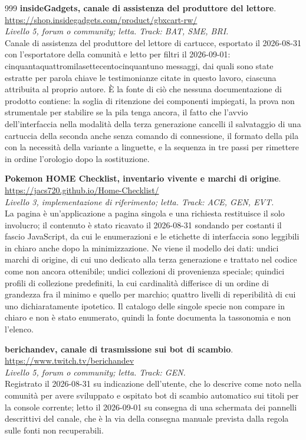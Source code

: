 \begin{thebibliography}{999}
  \textbf{insideGadgets, canale di assistenza del produttore del lettore}.
  \\ \url{https://shop.insidegadgets.com/product/gbxcart-rw/}
  \\ \emph{Livello 5, forum o community; letta. Track: BAT, SME, BRI.}
  \\ Canale di assistenza del produttore del lettore di cartucce, esportato il 2026-08-31 con l'esportatore della comunità e letto per filtri il 2026-09-01: cinquantaquattromilasettecentocinquantuno messaggi, dai quali sono state estratte per parola chiave le testimonianze citate in questo lavoro, ciascuna attribuita al proprio autore. È la fonte di ciò che nessuna documentazione di prodotto contiene: la soglia di ritenzione dei componenti impiegati, la prova non strumentale per stabilire se la pila tenga ancora, il fatto che l'avvio dell'interfaccia nella modalità della terza generazione cancelli il salvataggio di una cartuccia della seconda anche senza comando di connessione, il formato della pila con la necessità della variante a linguette, e la sequenza in tre passi per rimettere in ordine l'orologio dopo la sostituzione.

  \textbf{Pokemon HOME Checklist, inventario vivente e marchi di origine}.
  \\ \url{https://jacs720.github.io/Home-Checklist/}
  \\ \emph{Livello 3, implementazione di riferimento; letta. Track: ACE, GEN, EVT.}
  \\ La pagina è un'applicazione a pagina singola e una richiesta restituisce il solo involucro; il contenuto è stato ricavato il 2026-08-31 sondando per costanti il fascio JavaScript, da cui le enumerazioni e le etichette di interfaccia sono leggibili in chiaro anche dopo la minimizzazione. Ne viene il modello dei dati: undici marchi di origine, di cui uno dedicato alla terza generazione e trattato nel codice come non ancora ottenibile; undici collezioni di provenienza speciale; quindici profili di collezione predefiniti, la cui cardinalità differisce di un ordine di grandezza fra il minimo e quello per marchio; quattro livelli di reperibilità di cui uno dichiaratamente ipotetico. Il catalogo delle singole specie non compare in chiaro e non è stato enumerato, quindi la fonte documenta la tassonomia e non l'elenco.

  \textbf{berichandev, canale di trasmissione sui bot di scambio}.
  \\ \url{https://www.twitch.tv/berichandev}
  \\ \emph{Livello 5, forum o community; letta. Track: GEN.}
  \\ Registrato il 2026-08-31 su indicazione dell'utente, che lo descrive come noto nella comunità per avere sviluppato e ospitato bot di scambio automatico sui titoli per la console corrente; letto il 2026-09-01 su consegna di una schermata dei pannelli descrittivi del canale, che è la via della consegna manuale prevista dalla regola sulle fonti non recuperabili.


\end{thebibliography}
